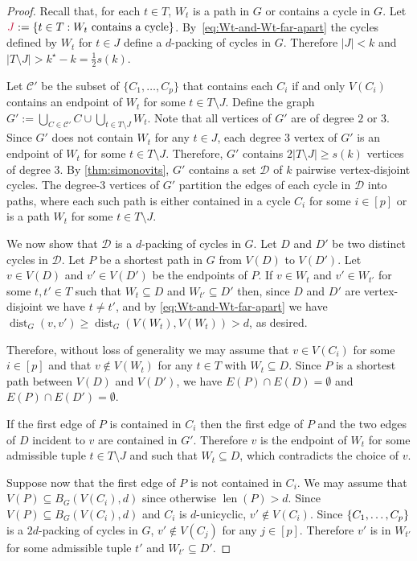 \documentclass{patmorin}
\DeclareMathOperator{\len}{len}
\DeclareMathOperator{\dist}{dist}
\DeclarePairedDelimiter\set{\{}{\}}
\begin{document}
\begin{proof}
  Recall that, for each $t\in T$, $W_t$ is a path in $G$ or contains a cycle in $G$. Let $\mathdefin{J}:=\{t\in T:\text{$W_t$ contains a cycle}\}$.  By~\eqref{eq:Wt-and-Wt-far-apart} the cycles defined by $W_t$ for $t\in J$ define a $d$-packing of cycles in $G$.  Therefore $|J|<k$ and $|T\setminus J|> k^\star-k= \tfrac{1}{2}s(k)$.

  Let $\mathcal{C}'$ be the subset of $\{C_1,\ldots,C_p\}$ that contains each $C_i$ if and only $V(C_i)$ contains an endpoint of $W_t$ for some $t\in T\setminus J$.  Define the graph $G':=\bigcup_{C\in\mathcal{C}'} C\cup \bigcup_{t\in T\setminus J} W_{t}$. Note that all vertices of $G'$ are of degree $2$ or $3$.  Since $G'$ does not contain $W_t$ for any $t\in J$, each degree $3$ vertex of $G'$ is an endpoint of $W_{t}$ for some $t\in T\setminus J$. Therefore, $G'$ contains $2|T\setminus J|\geq s(k)$ vertices of degree $3$. By \cref{thm:simonovits}, $G'$ contains a set $\mathcal{D}$ of $k$ pairwise vertex-disjoint cycles.  The degree-$3$ vertices of $G'$ partition the edges of each cycle in $\mathcal{D}$ into paths, where each such path is either contained in a cycle $C_i$ for some $i\in[p]$ or is a path $W_t$ for some $t\in T\setminus J$.

  We now show that $\mathcal{D}$ is a $d$-packing of cycles in $G$. Let $D$ and $D'$ be two distinct cycles in $\mathcal{D}$.  Let $P$ be a shortest path in $G$ from $V(D)$ to $V(D')$.  Let $v\in V(D)$ and $v'\in V(D')$ be the endpoints of $P$.  If $v\in W_t$ and $v'\in W_{t'}$ for some $t,t'\in T$ such that $W_t\subseteq D$ and $W_{t'}\subseteq D'$ then, since $D$ and $D'$ are vertex-disjoint we have $t\neq t'$, and by \eqref{eq:Wt-and-Wt-far-apart} we have $\dist_G(v,v')\ge \dist_G(V(W_t),V(W_t))>d$, as desired.

  Therefore, without loss of generality we may assume that $v\in V(C_i)$ for some $i\in[p]$ and that $v\notin V(W_t)$ for any $t\in T$ with $W_t\subseteq D$.  Since $P$ is a shortest path between $V(D)$ and $V(D')$, we have $E(P)\cap E(D)=\emptyset$ and $E(P)\cap E(D')=\emptyset$.

  If the first edge of $P$ is contained in $C_i$ then the first edge of $P$ and the two edges of $D$ incident to $v$ are contained in $G'$.  Therefore $v$ is the endpoint of $W_t$ for some admissible tuple $t\in T\setminus J$ and such that $W_t\subseteq D$, which contradicts the choice of $v$.

  Suppose now that the first edge of $P$ is not contained in $C_i$.  We may assume that $V(P)\subseteq B_G(V(C_i),d)$ since otherwise $\len(P)>d$.  Since $V(P)\subseteq B_G(V(C_i),d)$ and $C_i$ is $d$-unicyclic, $v'\not\in V(C_i)$.  Since $\set{C_1,\ldots,C_p}$ is a $2d$-packing of cycles in $G$, $v'\not\in V(C_j)$ for any $j\in[p]$. Therefore $v'$ is in $W_{t'}$ for some admissible tuple $t'$ and $W_{t'}\subseteq D'$.


\end{proof}
\end{document}
